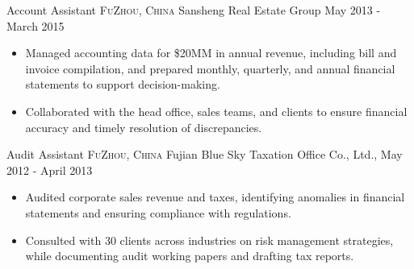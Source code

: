 \documentclass[10pt,a4paper]{article}
\begin{document}
\headedsection
{Account Assistant}
{{\small \textsc{FuZhou, China}}}
{Sansheng Real Estate Group}
{May 2013 - March 2015}
{
    \begin{itemize}
      \item Managed accounting data for \$20MM in annual revenue, including bill and invoice compilation, and prepared monthly, quarterly, and annual financial statements to support decision-making.
      \item Collaborated with the head office, sales teams, and clients to ensure financial accuracy and timely resolution of discrepancies.
    \end{itemize}
}

\headedsection
{Audit Assistant}
{{\small \textsc{FuZhou, China}}}
{Fujian Blue Sky Taxation Office Co., Ltd.,}
{May 2012 - April 2013}
{
    \begin{itemize}
      \item Audited corporate sales revenue and taxes, identifying anomalies in financial statements and ensuring compliance with regulations.
      \item Consulted with 30 clients across industries on risk management strategies, while documenting audit working papers and drafting tax reports.
    \end{itemize}
}



\end{document}
